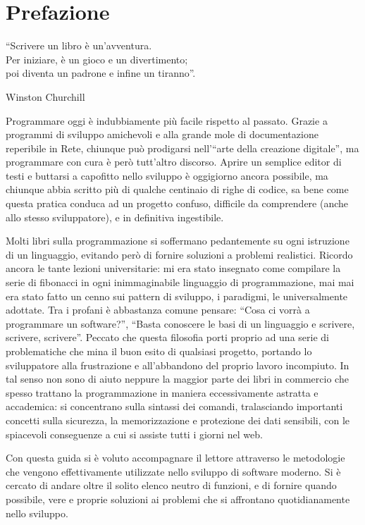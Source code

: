 \section*{Prefazione}
\label{cap:prefazione}

\epigraph{``Scrivere un libro è un'avventura.\\
Per iniziare, è un gioco e un divertimento; \\
poi diventa un padrone e infine un tiranno''.}%
{Winston Churchill}

Programmare oggi è indubbiamente più facile rispetto al passato. Grazie a programmi di sviluppo amichevoli e alla grande mole di documentazione reperibile in Rete, chiunque può prodigarsi nell'``arte della creazione digitale'', ma programmare con cura è però tutt'altro discorso. Aprire un semplice editor di testi e buttarsi a capofitto nello sviluppo è oggigiorno ancora possibile, ma chiunque abbia scritto più di qualche centinaio di righe di codice, sa bene come questa pratica conduca ad un progetto confuso, difficile da comprendere (anche allo stesso sviluppatore), e in definitiva ingestibile.

Molti libri sulla programmazione si soffermano pedantemente su ogni istruzione di un linguaggio, evitando però di fornire soluzioni a problemi realistici. Ricordo ancora le tante lezioni universitarie: mi era stato insegnato come compilare la serie di fibonacci in ogni inimmaginabile linguaggio di programmazione, mai mai era stato fatto un cenno sui pattern di sviluppo, i paradigmi, le  universalmente adottate. Tra i profani è abbastanza comune pensare: ``Cosa ci vorrà a programmare un software?'', ``Basta conoscere le basi di un linguaggio e scrivere, scrivere, scrivere''. Peccato che questa filosofia porti proprio ad una serie di problematiche che mina il buon esito di qualsiasi progetto, portando lo sviluppatore alla frustrazione e all'abbandono del proprio lavoro incompiuto. In tal senso non sono di aiuto neppure la maggior parte dei libri in commercio che spesso trattano la programmazione in maniera eccessivamente astratta e accademica: si concentrano sulla sintassi dei comandi, tralasciando importanti concetti sulla sicurezza, la memorizzazione e protezione dei dati sensibili, con le spiacevoli conseguenze a cui si assiste tutti i giorni nel web.

Con questa guida si è voluto accompagnare il lettore attraverso le metodologie che vengono effettivamente utilizzate nello sviluppo di software moderno. Si è cercato di andare oltre il solito elenco neutro di funzioni, e di fornire quando possibile, vere e proprie soluzioni ai problemi che si affrontano quotidianamente nello sviluppo.

